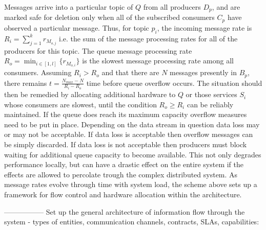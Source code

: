 Messages arrive into a particular topic of $Q$ from all producers $D_p$, and are marked safe for deletion only when all of the subscribed consumers $C_p$ have observed a particular message. Thus, for topic $p_i$, the incoming message rate is $\displaystyle R_i = \sum_{j=1}^k r_{M_{o,j}}$ i.e. the sum of the message processing rates for all of the producers for this topic. The queue message processing rate $\displaystyle R_o = \min_{i \in [1,l]}\{r_{M_{o,i}}\}$ is the slowest message processing rate among all consumers. Assuming $R_i > R_o$ and that there are $N$ messages presently in $B_p$, there remains $t = \frac{N_{max} - N} {R_i - R_o}$ time before queue overflow occurs. The situation should then be remedied by allocating additional hardware to $Q$ or those services $S_i$ whose consumers are slowest, until the condition $R_o \ge R_i$ can be reliably maintained. If the queue does reach its maximum capacity overflow measures need to be put in place. Depending on the data stream in question data loss may or may not be acceptable. If data loss is acceptable then overflow messages can be simply discarded. If data loss is not acceptable then producers must block waiting for additional queue capacity to become available. This not only degrades performance locally, but can have a drastic effect on the entire system if the effects are allowed to percolate trough the complex distributed system. As message rates evolve through time with system load, the scheme above sets up a framework for flow control and hardware allocation within the architecture.

-----------------
Set up the general architecture of information flow through the system - types of entities, communication channels, contracts, SLAs, capabilities:

